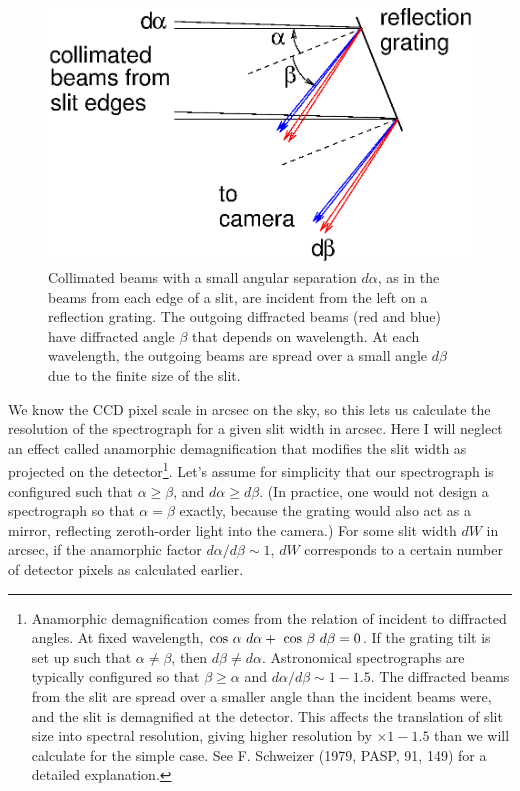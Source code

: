 \documentclass[12pt]{article}
\begin{document}
\begin{figure}[ht]
\centerline{
\includegraphics[width=4.5truein]{gratingslit.eps}
}
\caption{Collimated beams with a small angular separation $d\alpha$, 
as in the beams from each edge of a slit, are incident from the left 
on a reflection grating.
The outgoing diffracted beams (red and blue) have diffracted angle
$\beta$ that depends on wavelength.  At each wavelength, the
outgoing beams are spread over a small angle $d\beta$ due to
the finite size of the slit.
}
\label{fig-gratingslit}
\end{figure}

We know the CCD pixel scale in arcsec on the sky, so this lets
us calculate the resolution of the spectrograph for a given
slit width in arcsec.  Here I will neglect an effect called 
anamorphic demagnification that modifies the slit width as
projected on the detector\footnote{
Anamorphic demagnification
comes from the relation of incident to diffracted angles.
At fixed wavelength, 
${\rm cos}~\alpha~d\alpha +\ {\rm cos}~\beta~d\beta =0$.
If the grating tilt is set up such that $\alpha \neq \beta$,
then $d\beta \neq d\alpha$.  Astronomical spectrographs
are typically configured so that $\beta \geq \alpha$ and
$d\alpha/d\beta \sim 1-1.5$.  The diffracted beams from the 
slit are spread over a smaller angle than the incident beams were, and the
slit is demagnified at the detector.  This affects the translation 
of slit size into spectral resolution, giving higher resolution 
by $\times 1-1.5$ than we will calculate for the simple case.  See
F. Schweizer (1979, PASP, 91, 149) for a detailed explanation.}.
Let's assume for simplicity
that our spectrograph is configured such that $\alpha \geq \beta$,
and $d\alpha \geq d\beta$.  (In practice, one would not design
a spectrograph so that $\alpha=\beta$ exactly, because the grating would
also act as a mirror, reflecting zeroth-order light into the camera.)
For some slit width $dW$ in arcsec, if the anamorphic factor 
$d\alpha/d\beta \sim 1$, $dW$ corresponds to a certain number 
of detector pixels as calculated earlier.
\end{document}

